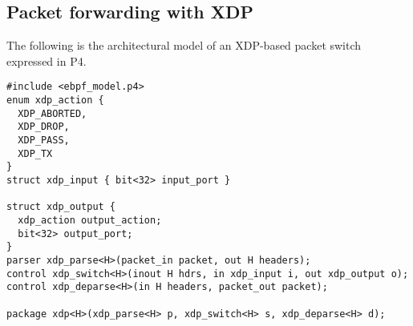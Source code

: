 \subsection{Packet forwarding with XDP}

The following is the architectural model of an XDP-based packet switch
expressed in P4.

\cite{p4-xdp-backend}

\begin{lstlisting}
#include <ebpf_model.p4>
enum xdp_action {
  XDP_ABORTED,
  XDP_DROP,
  XDP_PASS,
  XDP_TX
}
struct xdp_input { bit<32> input_port }

struct xdp_output {
  xdp_action output_action;
  bit<32> output_port;
}
parser xdp_parse<H>(packet_in packet, out H headers);
control xdp_switch<H>(inout H hdrs, in xdp_input i, out xdp_output o);
control xdp_deparse<H>(in H headers, packet_out packet);

package xdp<H>(xdp_parse<H> p, xdp_switch<H> s, xdp_deparse<H> d);
\end{lstlisting}
